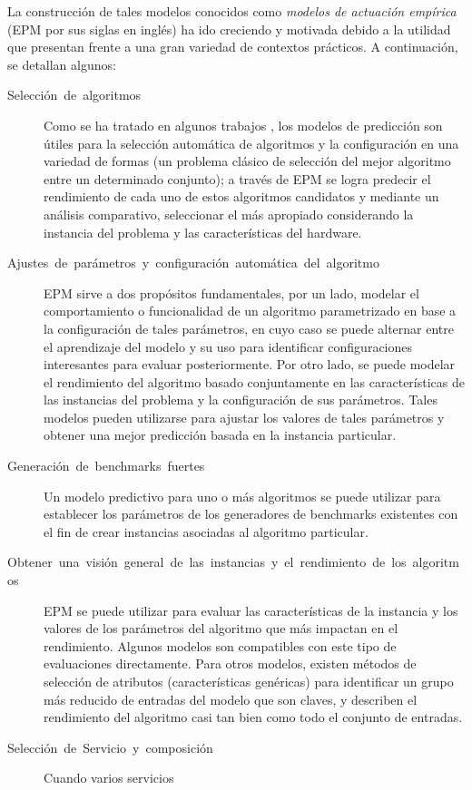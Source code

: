 La construcción de tales modelos conocidos como \emph{modelos de actuación
empírica }(EPM por sus siglas en inglés) ha ido creciendo y motivada
debido a la utilidad que presentan frente a una gran variedad de contextos
prácticos. A continuación, se detallan algunos:
\begin{description}
\item [{Selección~de~algoritmos}] Como se ha tratado en algunos trabajos
\citet{Hutter2014}, los modelos de predicción son útiles para la
selección automática de algoritmos y la configuración en una variedad
de formas (un problema clásico de selección del mejor algoritmo entre
un determinado conjunto); a través de \ac{EPM} se logra predecir
el rendimiento de cada uno de estos algoritmos candidatos y mediante
un análisis comparativo, seleccionar el más apropiado considerando
la instancia del problema y las características del hardware. 
\item [{Ajustes~de~parámetros~y~configuración~automática~del~algoritmo}] \ac{EPM}
sirve a dos propósitos fundamentales, por un lado, modelar el comportamiento
o funcionalidad de un algoritmo parametrizado en base a la configuración
de tales parámetros, en cuyo caso se puede alternar entre el aprendizaje
del modelo y su uso para identificar configuraciones interesantes
para evaluar posteriormente. Por otro lado, se puede modelar el rendimiento
del algoritmo basado conjuntamente en las características de las instancias
del problema y la configuración de sus parámetros. Tales modelos pueden
utilizarse para ajustar los valores de tales parámetros y obtener
una mejor predicción basada en la instancia particular. 
\item [{Generación~de~benchmarks~fuertes}] Un modelo predictivo para
uno o más algoritmos se puede utilizar para establecer los parámetros
de los generadores de benchmarks existentes con el fin de crear instancias
asociadas al algoritmo particular. 
\item [{Obtener~una~visión~general~de~las~instancias~y~el~rendimiento~de~los~algoritmos}] \ac{EPM}
se puede utilizar para evaluar las características de la instancia
y los valores de los parámetros del algoritmo que más impactan en
el rendimiento. Algunos modelos son compatibles con este tipo de evaluaciones
directamente. Para otros modelos, existen métodos de selección de
atributos (características genéricas) para identificar un grupo más
reducido de entradas del modelo que son claves, y describen el rendimiento
del algoritmo casi tan bien como todo el conjunto de entradas. 
\item [{Selección~de~Servicio~y~composición}] Cuando varios servicios

\end{description}
